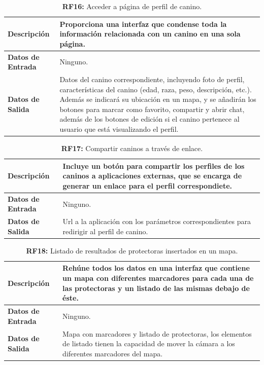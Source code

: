 \documentclass[a4paper, 12pt]{article}
\begin{document}
\begin{table}[H]
\captionsetup{list=no}%
\captionsetup{justification=raggedright,singlelinecheck=false}
\captionsetup{labelformat=empty}
\caption*{\textbf{RF16:} Acceder a página de perfil de canino.}
\label{tab:RF16}
	\begin{tabular}{|m{5cm}|m{10cm}|}
	\hline
	\textbf{Descripción} & Proporciona una interfaz que condense toda la información relacionada con un canino en una sola página. \\ 
	\hline
	\textbf{Datos de Entrada} & Ninguno. \\ 
	\hline
	\textbf{Datos de Salida} & Datos del canino correspondiente, incluyendo foto de perfil, características del canino (edad, raza, peso, descripción, etc.). Además se indicará su ubicación en un mapa, y se añadirán los botones para marcar como favorito, compartir y abrir chat, además de los botones de edición si el canino pertenece al usuario que está visualizando el perfil. \\ 
	\hline
\end{tabular}
\end{table}

\begin{table}[H]
\captionsetup{list=no}%
\captionsetup{justification=raggedright,singlelinecheck=false}
\captionsetup{labelformat=empty}
\caption*{\textbf{RF17:} Compartir caninos a través de enlace.}
\label{tab:RF17}
	\begin{tabular}{|m{5cm}|m{10cm}|}
	\hline
	\textbf{Descripción} & Incluye un botón para compartir los perfiles de los caninos a aplicaciones externas, que se encarga de generar un enlace para el perfil correspondiete.  \\ 
	\hline
	\textbf{Datos de Entrada} & Ninguno. \\ 
	\hline
	\textbf{Datos de Salida} & Url a la aplicación con los parámetros correspondientes para redirigir al perfil de canino. \\ 
	\hline
\end{tabular}
\end{table}

\begin{table}[H]
\captionsetup{list=no}%
\captionsetup{justification=raggedright,singlelinecheck=false}
\captionsetup{labelformat=empty}
\caption*{\textbf{RF18:} Listado de resultados de protectoras insertados en un mapa.}
\label{tab:RF18}
	\begin{tabular}{|m{5cm}|m{10cm}|}
	\hline
	\textbf{Descripción} & Rehúne todos los datos en una interfaz que contiene un mapa con diferentes marcadores para cada una de las protectoras y un listado de las mismas debajo de éste. \\ 
	\hline
	\textbf{Datos de Entrada} & Ninguno. \\ 
	\hline
	\textbf{Datos de Salida} & Mapa con marcadores y listado de protectoras, los elementos  de listado tienen la capacidad de mover la cámara a los diferentes marcadores del mapa. \\ 
	\hline
\end{tabular}
\end{table}
\end{document}
